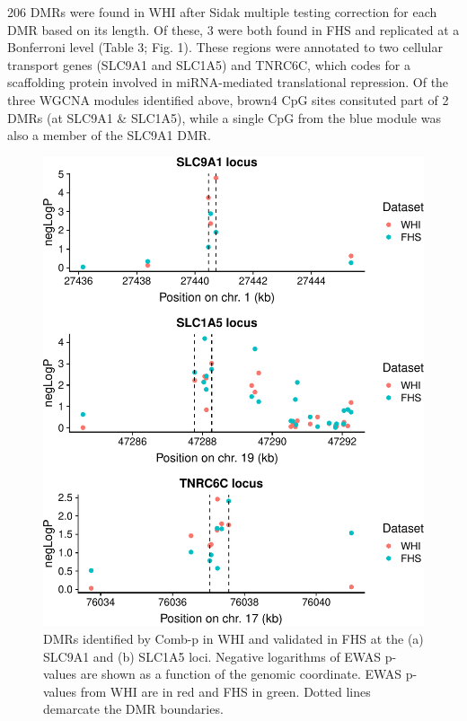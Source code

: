 \documentclass[]{article}
\theoremstyle{definition}
\theoremstyle{definition}
\theoremstyle{definition}
\theoremstyle{remark}
\begin{document}
206 DMRs were found in WHI after Sidak multiple testing correction for
each DMR based on its length. Of these, 3 were both found in FHS and
replicated at a Bonferroni level (Table 3; Fig. 1). These regions were
annotated to two cellular transport genes (SLC9A1 and SLC1A5) and
TNRC6C, which codes for a scaffolding protein involved in miRNA-mediated
translational repression. Of the three WGCNA modules identified above,
brown4 CpG sites consituted part of 2 DMRs (at SLC9A1 \& SLC1A5), while
a single CpG from the blue module was also a member of the SLC9A1 DMR.

\begin{figure}[htbp]
\centering
\includegraphics{../doc/figures/combp-plots-1.pdf}
\caption{\label{fig:combp-plots}DMRs identified by Comb-p in WHI and
validated in FHS at the (a) SLC9A1 and (b) SLC1A5 loci. Negative
logarithms of EWAS p-values are shown as a function of the genomic
coordinate. EWAS p-values from WHI are in red and FHS in green. Dotted
lines demarcate the DMR boundaries.}
\end{figure}
\end{document}
